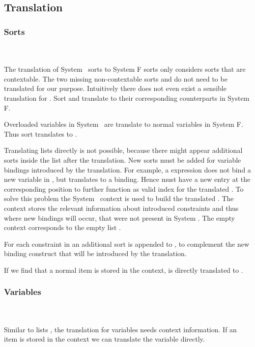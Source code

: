 \subsection{Translation}
\subsubsection{Sorts}\hfill\\\\
The translation of System \Fo\ sorts to System F sorts only considers sorts that are contextable. 
The two missing non-contextable sorts  and  do not need to be translated for our purpose. 
Intuitively there does not even exist a sensible translation for .
\DPTSort
Sort  and  translate to their corresponding counterparts in System F. 

\noindent  Overloaded variables in System \Fo\ are translate to normal variables in System F. 
Thus sort  translates to . 

\noindent Translating lists  directly is not possible, because there might appear additional sorts inside the list after the translation. 
New sorts must be added for variable bindings introduced by the translation. 
For example, a    \Constr{=}    expression does not bind a new variable in , but translates to a     binding. 
Hence  must have a new entry  at the corresponding position to further function as valid index for the translated . 
To solve this problem the System \Fo\ context  is used to build the translated . 
The context stores the relevant information about introduced constraints and thus where new bindings will occur, that were not present in System \Fo. 
\DPTSorts
The empty context  corresponds to the empty list \Constr{[]}.

\noindent For each constraint in  an additional sort  is appended to , to complement the new binding construct that will be introduced by the translation. 

\noindent If we find that a normal item is stored in the context,  is directly translated to  .

\subsubsection{Variables}\hfill\\\\
Similar to lists , the translation for variables  needs context information.  
\DPTVar
If an item is stored in the context we can translate the variable directly. 

